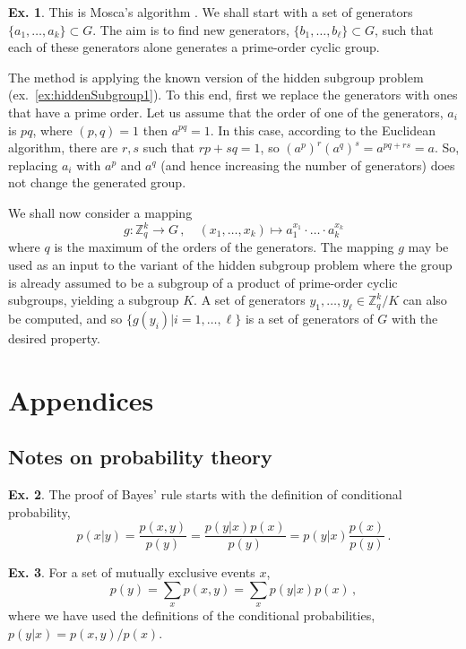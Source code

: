 \documentclass[a4paper,12pt]{article}
\theoremstyle{definition}
\newtheorem{exercise}{Ex.}[section]
\begin{document}
\begin{exercise}
 This is Mosca's algorithm \cite{mosca}. We shall start with a set of generators $\{a_1, \dots, a_k\}\subset G$. The aim is to find new generators, $\{b_1, \dots, b_\ell\}\subset G$, such that each of these generators alone generates a prime-order cyclic group.
 
 The method is applying the known version of the hidden subgroup problem (ex.~\ref{ex:hiddenSubgroup1}). To this end, first we replace the generators with ones that have a prime order. Let us assume that the order of one of the generators, $a_i$ is $pq$, where $(p, q)=1$ then $a^{pq}=1$. In this case, according to the Euclidean algorithm, there are $r, s$ such that $rp+sq=1$, so $(a^p)^r(a^q)^s=a^{pq+rs}=a$. So, replacing $a_i$ with $a^p$ and $a^q$ (and hence increasing the number of generators) does not change the generated group.
 
 We shall now consider a mapping
 \[
  g:\mathbb{Z}_q^k\to G\,,\quad (x_1, \dots, x_k) \mapsto a_1^{x_1} \cdot \dots \cdot a_k^{x_k}
 \]
 where $q$ is the maximum of the orders of the generators. The mapping $g$ may be used as an input to the variant of the hidden subgroup problem where the group is already assumed to be a subgroup of a product of prime-order cyclic subgroups, yielding a subgroup $K$. A set of generators $y_1, \dots, y_\ell \in \mathbb{Z}_q^k/K$ can also be computed, and so $\{g(y_i)| i=1,\dots, \ell\}$ is a set of generators of $G$ with the desired property.
\end{exercise}



\appendix
\section{Appendices}
\subsection{Notes on probability theory}
\begin{exercise} The proof of Bayes' rule starts with the definition of conditional probability,
 \[
  p(x|y) = \frac{p(x, y)}{p(y)} = \frac{p(y|x)p(x)}{p(y)} = p(y|x)\frac{p(x)}{p(y)}\,.
 \]
\end{exercise}

\begin{exercise}
 For a set of mutually exclusive events $x$,
 \[
  p(y) = \sum_x p(x, y) = \sum_x p(y|x) p(x)\,,
 \]
 where we have used the definitions of the conditional probabilities, $p(y|x) = p(x, y)/p(x)$.
\end{exercise}
\end{document}
